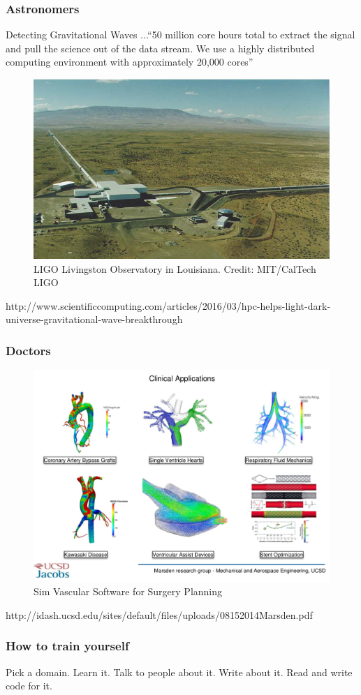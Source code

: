 \documentclass{beamer}
\begin{document}
\begin{frame}
  \frametitle{Astronomers}
  \center Detecting Gravitational Waves
  \center ...``50 million core hours total to extract the signal and pull the
    science out of the data stream. We use a highly distributed computing
    environment with approximately 20,000 cores''
  \begin{figure} \centering 
    \includegraphics[width=.5\textwidth]{figs/ast/ligo.jpg}
    \caption{ \small LIGO Livingston Observatory in Louisiana.  Credit: MIT/CalTech LIGO }
  \end{figure}
  {\small http://www.scientificcomputing.com/articles/2016/03/hpc-helps-light-dark-universe-gravitational-wave-breakthrough }
\end{frame}

\begin{frame}
  \frametitle{Doctors}
  \begin{figure} \centering 
    \includegraphics[width=.8\textwidth]{figs/doc/clinical-applications.png}
    \caption{Sim Vascular Software for Surgery Planning}
  \end{figure}
  {\tiny 
    http://idash.ucsd.edu/sites/default/files/uploads/08152014Marsden.pdf
  }
\end{frame}

\begin{frame}
  \frametitle{How to train yourself}
  \center Pick a domain.
  \center Learn it.
  \center Talk to people about it.
  \center Write about it.
  \center Read and write code for it.
\end{frame}
\end{document}
